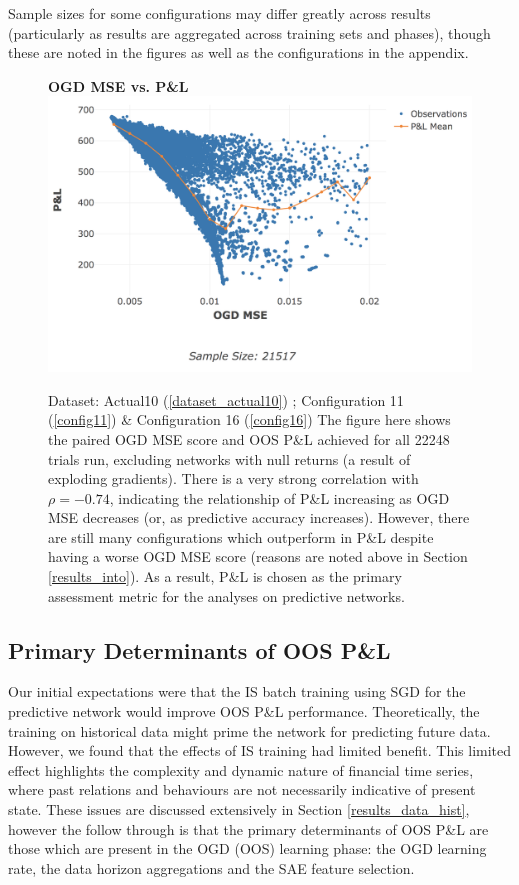 \documentclass[a4paper,11pt,oneside]{article}
\theoremstyle{plain}
\theoremstyle{definition}
\begin{document}
	Sample sizes for some configurations may differ greatly across results (particularly as results are aggregated across training sets and phases), though these are noted in the figures as well as the configurations in the appendix.\newline
	
		\begin{figure}[H]
		\textbf{OGD MSE vs. P\&L}
		\centering
		\includegraphics[scale=0.45]{images/results/intro/ogdmse_pl.png}
		\caption[OGD MSE vs. OOS P\&L]
		{Dataset: Actual10 (\ref{dataset_actual10}) ; Configuration 11 (\ref{config11}) \&  Configuration 16 (\ref{config16}) \newline 
			The figure here shows the paired OGD MSE score and OOS P\&L achieved for all 22248 trials run, excluding networks with null returns (a result of exploding gradients). There is a very strong correlation with $\rho = -0.74$, indicating the relationship of P\&L increasing as OGD MSE decreases (or, as predictive accuracy increases). However, there are still many configurations which outperform in P\&L despite having a worse OGD MSE score (reasons are noted above in Section \ref{results_into}). As a result, P\&L is chosen as the primary assessment metric for the analyses on predictive networks. }
		\label{figure-ogdmse_pl}
	\end{figure}
	
	\newpage
	\subsection{Primary Determinants of OOS P\&L}\label{results_oos_pl}
	
	Our initial expectations were that the IS batch training using SGD for the predictive network would improve OOS P\&L performance. Theoretically, the training on historical data might prime the network for predicting future data. However, we found that the effects of IS training had limited benefit. This limited effect highlights the complexity and dynamic nature of financial time series, where past relations and behaviours are not necessarily indicative of present state. These issues are discussed extensively in Section \ref{results_data_hist}, however the follow through is that the primary determinants of OOS P\&L are those which are present in the OGD (OOS) learning phase: the OGD learning rate, the data horizon aggregations and the SAE feature selection.\newline
	
\end{document}
